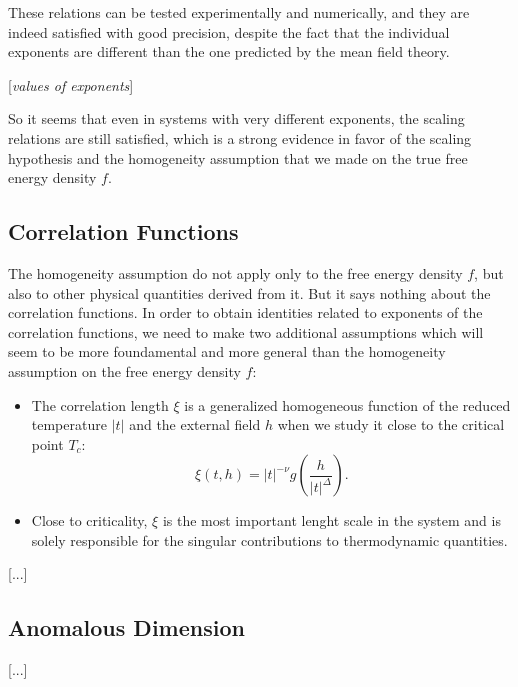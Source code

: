 These relations can be tested experimentally and numerically, and they are indeed satisfied with good precision, despite the fact that the individual exponents are different than the one predicted by the mean field theory.

    [\textit{values of exponents}]

So it seems that even in systems with very different exponents, the scaling relations are still satisfied, which is a strong evidence in favor of the scaling hypothesis and the homogeneity assumption that we made on the true free energy density \(f\).

\subsection{Correlation Functions}

The homogeneity assumption do not apply only to the free energy density \(f\), but also to other physical quantities derived from it. But it says nothing about the correlation functions. In order to obtain identities related to exponents of the correlation functions, we need to make two additional assumptions which will seem to be more foundamental and more general than the homogeneity assumption on the free energy density \(f\):
\begin{itemize}
    \item The correlation length \(\xi\) is a generalized homogeneous function of the reduced temperature \(\vert t \vert\) and the external field \(h\) when we study it close to the critical point \(T_c\):
          \[
              \xi(t,h) = \vert t \vert^{-\nu} g\left(\frac{h}{\vert t \vert^{\Delta}}\right).
          \]
    \item Close to criticality, \(\xi\) is the most important lenght scale in the system and is solely responsible for the singular contributions to thermodynamic quantities.
\end{itemize}

[...]

\subsection{Anomalous Dimension}

[...]